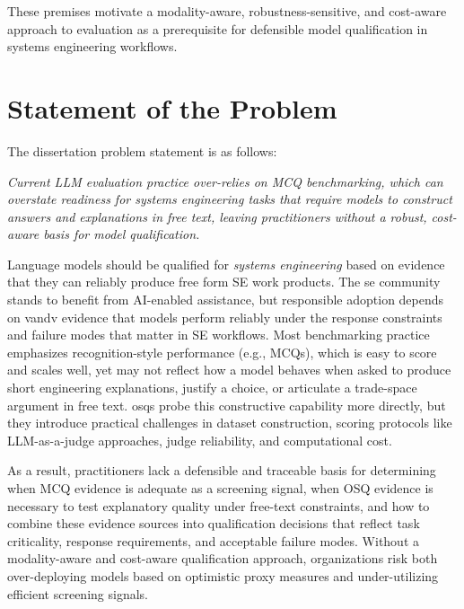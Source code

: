 These premises motivate a modality-aware, robustness-sensitive, and cost-aware approach to evaluation as a prerequisite for defensible model qualification in systems engineering workflows.


\section{Statement of the Problem}
The dissertation problem statement is as follows:

\emph{Current LLM evaluation practice over-relies on MCQ benchmarking, which can overstate readiness for systems engineering tasks that require models to construct answers and explanations in free text, leaving practitioners without a robust, cost-aware basis for model qualification.}

Language models should be qualified for \emph{systems engineering} based on evidence that they can reliably produce free form SE work products. The \ac{se} community stands to benefit from AI-enabled assistance, but responsible adoption depends on \ac{vandv} evidence that models perform reliably under the response constraints and failure modes that matter in SE workflows. Most benchmarking practice emphasizes recognition-style performance (e.g., MCQs), which is easy to score and scales well, yet may not reflect how a model behaves when asked to produce short engineering explanations, justify a choice, or articulate a trade-space argument in free text. \acp{osq} probe this constructive capability more directly, but they introduce practical challenges in dataset construction, scoring protocols like LLM-as-a-judge approaches, judge reliability, and computational cost.

As a result, practitioners lack a defensible and traceable basis for determining when MCQ evidence is adequate as a screening signal, when OSQ evidence is necessary to test explanatory quality under free-text constraints, and how to combine these evidence sources into qualification decisions that reflect task criticality, response requirements, and acceptable failure modes. Without a modality-aware and cost-aware qualification approach, organizations risk both over-deploying models based on optimistic proxy measures and under-utilizing efficient screening signals.

